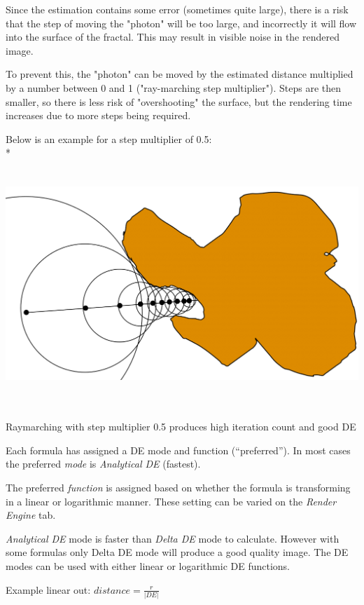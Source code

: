Since the estimation contains some error (sometimes quite large), there
is a risk that the step of moving the "photon" will be too large, and
incorrectly it will flow into the surface of the fractal. This may
result in visible noise in the rendered image.

To prevent this, the "photon" can be moved by the estimated distance
multiplied by a number between 0 and 1 ("ray-marching step multiplier").
Steps are then smaller, so there is less risk of "overshooting" the
surface, but the rendering time increases due to more steps being
required.

Below is an example for a step multiplier of 0.5:\\*
\includegraphics[width=6.68611in,height=3.67431in]{img/manual/media/image5.png}

Raymarching with step multiplier 0.5 produces high iteration count and
good DE

Each formula has assigned a DE mode and function (``preferred''). In most
cases the preferred \emph{mode} is \emph{Analytical DE} (fastest).

The preferred \emph{function} is assigned based on whether the formula
is transforming in a linear or logarithmic manner. These setting can be
varied on the \emph{Render Engine} tab.

\emph{Analytical DE} mode is faster than \emph{Delta DE} mode to calculate. However
with some formulas only Delta DE mode will produce a good quality image.
The DE modes can be used with either linear or logarithmic DE functions.

Example linear out: $ distance = \frac{r}{\lvert DE \rvert} $

